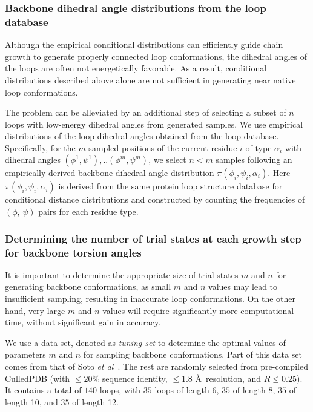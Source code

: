 \subsubsection*{Backbone dihedral angle distributions from the loop database}

Although the empirical conditional distributions can efficiently
guide chain growth to generate properly connected loop
conformations, the dihedral angles of the loops are often not
energetically favorable. As a result, conditional distributions
described above alone are not sufficient in generating near native
loop conformations.

The problem can be alleviated by an additional step of selecting a
subset of $n$ loops with low-energy dihedral angles from generated
samples. We use empirical distributions of the loop dihedral angles
obtained from the loop database. Specifically, for the $m$ sampled
positions of the current residue $i$ of type $\alpha_{i}$ with
dihedral angles $(\phi^{1}, \psi^{1}),..(\phi^{m},\psi^{m})$, we
select $n<m$ samples following an empirically derived backbone
dihedral angle distribution $\pi(\phi_i,\psi_i,\alpha_{i})$. Here
$\pi(\phi_i,\psi_i,\alpha_{i})$ is derived from the same protein
loop structure database for conditional distance distributions and
constructed by counting the frequencies of $(\phi, \, \psi)$ pairs
for each residue type.


\subsubsection*{Determining the number of trial states at each growth
step for backbone torsion angles}

It is important to determine the appropriate size of trial states
$m$ and $n$ for generating backbone conformations, as small $m$ and
$n$ values may lead to insufficient sampling, resulting in
inaccurate loop conformations. On the other hand, very large $m$ and
$n$ values will require significantly more computational time,
without significant gain in accuracy.

We use a data set, denoted as {\it tuning-set}\/ to determine the
optimal values of parameters $m$ and $n$ for sampling backbone
conformations. Part of this data set comes from that of Soto {\it et
al}~\cite{soto2008}. The rest are randomly selected from
pre-compiled CulledPDB (with $\le 20\%$ sequence identity, $\le 1.8$
\r{A}\ resolution, and $R\le 0.25$). It contains a total of $140$
loops, with $35$ loops of length 6, $35$ of length 8, $35$ of length
10, and $35$ of length 12.

